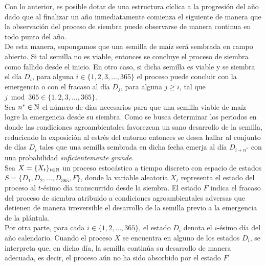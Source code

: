 Con lo anterior, es posible dotar de una estructura cíclica a la progresión del año dado que al finalizar un año inmediatamente comienza el siguiente de manera que la observación del proceso de siembra puede observarse de manera continua en todo punto del año.\\

De esta manera, supongamos que una semilla de maíz será sembrada en campo abierto. Si tal semilla no es viable, entonces se concluye el proceso de siembra como fallido desde el inicio. En otro caso, si dicha semilla es viable y se siembra el día $D_i$, para alguna $i\in\{1,2,3,\ldots, 365\}$ el proceso puede concluir con la emergencia o con el fracaso al día $D_j$, para alguna $j\geq i$, tal que $j\bmod{365} \in \{1,2,3,\ldots, 365\}$.\\

Sea $n^*\in \mathbb{N}$ el número de días necesarios para que una semilla viable de maíz logre la emergencia desde su siembra. Como se busca determinar los periodos en donde las condiciones agroambientales favorezcan un sano desarrollo de la semilla, reduciendo la exposición al estrés del entorno entonces se desea hallar al conjunto de días $D_i$ tales que una semilla sembrada en dicha fecha emerja al día $D_{i+n^*}$ con una probabilidad \textit{suficientemente grande}.\\

Sea $X=\{X_t\}_{t\in \mathbb{N}}$ un proceso estocástico a tiempo discreto con espacio de estados $S=\{D_1, D_2,\ldots, D_{365}, F\}$, donde la variable aleatoria $X_t$ representa el estado del proceso al $t$-ésimo día transcurrido desde la siembra. El estado $F$ indica el fracaso del proceso de siembra atribuido a condiciones agroambientales adversas que detienen de manera irreversible el desarrollo de la semilla previo a la emergencia de la plántula.\\


Por otra parte, para cada $i\in\{1,2,\ldots,365\}$, el estado $D_i$ denota el $i$-ésimo día del año calendario. Cuando el proceso $X$ se encuentra en alguno de los estados $D_i$, se interpreta que, en dicho día, la semilla continúa su desarrollo de manera adecuada, es decir, el proceso aún no ha sido absorbido por el estado $F$.\\

